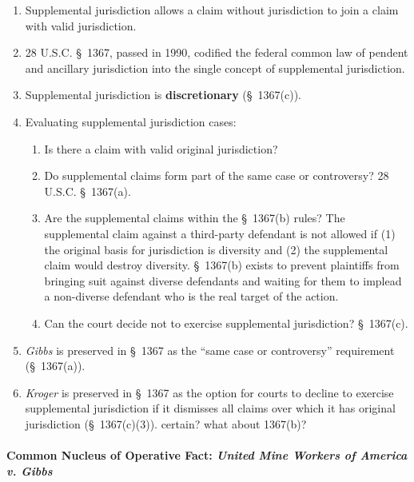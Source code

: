 \begin{enumerate}
    \item Supplemental jurisdiction allows a claim without jurisdiction to 
    join a claim with valid jurisdiction.
    \item 28 U.S.C. \S\ 1367, passed in 1990, codified the federal common law 
    of pendent and ancillary jurisdiction into the single concept of 
    supplemental jurisdiction.
    \item Supplemental jurisdiction is \textbf{discretionary} (\S\ 1367(c)).  
    \item Evaluating supplemental jurisdiction cases:
    \begin{enumerate}
        \item Is there a claim with valid original jurisdiction?
        \item Do supplemental claims form part of the same case or 
        controversy?  28 U.S.C. \S\ 1367(a).
        \item Are the supplemental claims within the \S\ 1367(b) rules? The 
        supplemental claim against a third-party defendant is not allowed if 
        (1) the original basis for jurisdiction is diversity and (2) the 
        supplemental claim would destroy diversity. \S\ 1367(b) exists to 
        prevent plaintiffs from bringing suit against diverse defendants and 
        waiting for them to implead a non-diverse defendant who is the real 
        target of the action.
        \item Can the court decide not to exercise supplemental jurisdiction?  
        \S\ 1367(c).
    \end{enumerate}
    \item \emph{Gibbs} is preserved in \S\ 1367 as the ``same case or 
    controversy'' requirement (\S\ 1367(a)).
    \item \emph{Kroger} is preserved in \S\ 1367 as the option for courts to 
    decline to exercise supplemental jurisdiction if it dismisses all claims 
    over which it has original jurisdiction (\S\ 1367(c)(3)). %
    certain? what about 1367(b)?
\end{enumerate}

\paragraph{Common Nucleus of Operative Fact: \emph{United Mine Workers of 
America v. Gibbs}}

